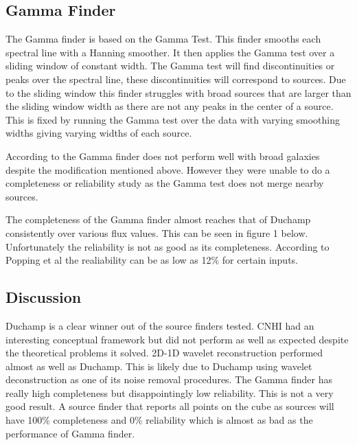 \documentclass[prodmode,acmtecs]{acmsmall} \usepackage[ruled]{algorithm2e}
\begin{document}
\subsection{Gamma Finder}
The Gamma finder is based on the Gamma Test. This finder smooths each spectral line with a Hanning
smoother. It then applies the Gamma test over a sliding window of constant width. The Gamma test will
find discontinuities or peaks over the spectral line, these discontinuities will correspond to sources. 
Due to the sliding window this finder struggles with broad sources that are larger
than the sliding window width as there are not any peaks in the center of a source. This is fixed by
running the Gamma test over the data with varying smoothing widths giving varying widths of each source.
\cite{boyce2003gammafinder}

According to \cite{popping2012comparison} the Gamma finder does not perform well with broad galaxies
despite the modification mentioned above. However they were unable to do a completeness or reliability
study as the Gamma test does not merge nearby sources.

The completeness of the Gamma finder almost reaches that of Duchamp consistently over various flux values. 
This can be seen in figure 1 below. Unfortunately the reliability is not as good as its completeness. According
to Popping et al the realiability can be as low as 12\% for certain inputs. 

\subsection{Discussion}
Duchamp is a clear winner out of the source finders tested. CNHI had an interesting conceptual framework 
but did not perform as well as expected despite the theoretical problems it solved. 2D-1D wavelet
reconstruction performed almost as well as Duchamp. This is likely due to Duchamp using wavelet deconstruction
as one of its noise removal procedures. The Gamma finder has really high completeness but disappointingly
low reliability. This is not a very good result. A source finder that reports all points on the cube as sources will
have 100\% completeness and 0\% reliability which is almost as bad as the performance of Gamma finder.
    
\end{document}
